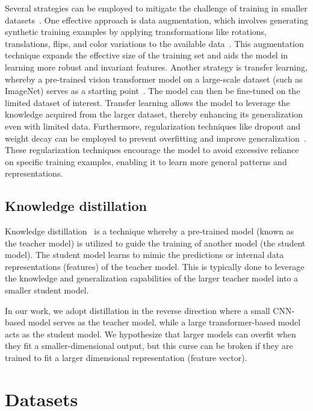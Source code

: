 \documentclass[10pt,twocolumn,letterpaper]{article}
\begin{document}
Several strategies can be employed to mitigate the challenge of training in smaller datasets~\cite{steiner2021train}. One effective approach is data augmentation, which involves generating synthetic training examples by applying transformations like rotations, translations, flips, and color variations to the available data~\cite{steiner2021train}. This augmentation technique expands the effective size of the training set and aids the model in learning more robust and invariant features. Another strategy is transfer learning, whereby a pre-trained vision transformer model on a large-scale dataset (such as ImageNet) serves as a starting point~\cite{weiss2016survey}. The model can then be fine-tuned on the limited dataset of interest. Transfer learning allows the model to leverage the knowledge acquired from the larger dataset, thereby enhancing its generalization even with limited data. Furthermore, regularization techniques like dropout and weight decay can be employed to prevent overfitting and improve generalization~\cite{steiner2021train}. These regularization techniques encourage the model to avoid excessive reliance on specific training examples, enabling it to learn more general patterns and representations.

\subsection{Knowledge distillation}

Knowledge distillation~\cite{habib2023knowledge} is a technique whereby a pre-trained model (known as the teacher model) is utilized to guide the training of another model (the student model). The student model learns to mimic the predictions or internal data representations (features) of the teacher model. This is typically done to leverage the knowledge and generalization capabilities of the larger teacher model into a smaller student model. 

In our work, we adopt distillation in the reverse direction where a small CNN-based model serves as the teacher model, while a large transformer-based model acts as the student model. We hypothesize that larger models can overfit when they fit a smaller-dimensional output, but this curse can be broken if they are trained to fit a larger dimensional representation (feature vector).


\section{Datasets}
\label{sec:dataset}
\end{document}
